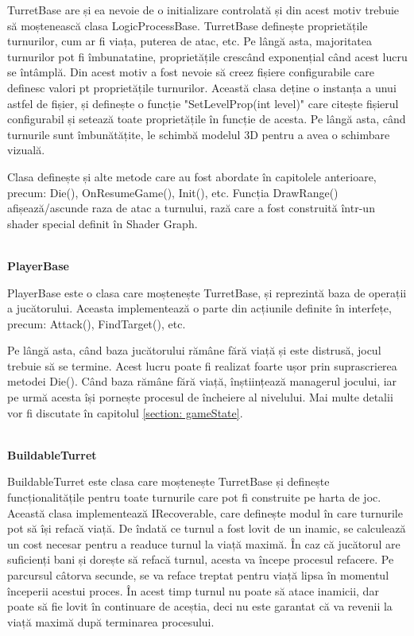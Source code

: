 \documentclass[12pt, a4paper]{article}
\begin{document}
	TurretBase are și ea nevoie de o initializare controlată și din acest motiv trebuie să moștenească clasa LogicProcessBase. TurretBase definește proprietățile turnurilor, cum ar fi viața, puterea de atac, etc. Pe lângă asta, majoritatea turnurilor pot fi îmbunatatine, proprietățile crescând exponențial când acest lucru se întâmplă. Din acest motiv a fost nevoie să creez fișiere configurabile care definesc valori pt proprietățile turnurilor. Această clasa deține o instanța a unui astfel de fișier, și definește o funcție "SetLevelProp(int level)" care citește fișierul configurabil și setează toate proprietățile în funcție de acesta. Pe lângă asta, când turnurile sunt îmbunătățite, le schimbă modelul 3D pentru a avea o schimbare vizuală.
	\newline
	
	Clasa definește și alte metode care au fost abordate în capitolele anterioare, precum: Die(), OnResumeGame(), Init(), etc. Funcția DrawRange() afișează/ascunde raza de atac a turnului, rază care a fost construită într-un shader special definit în Shader Graph.
	
	\ \\
	\textbf{PlayerBase}
	
	PlayerBase este o clasa care moștenește TurretBase, și reprezintă baza de operații a jucătorului. Aceasta implementează o parte din acțiunile definite în interfețe, precum: Attack(), FindTarget(), etc.
	\newline
	
	Pe lângă asta, când baza jucătorului rămâne fără viață și este distrusă, jocul trebuie să se termine. Acest lucru poate fi realizat foarte ușor prin suprascrierea metodei Die(). Când baza rămâne fără viață, înștiințează managerul jocului, iar pe urmă acesta își pornește procesul de încheiere al nivelului. Mai multe detalii vor fi discutate în capitolul \ref{section: gameState}.
	
	\ \\
	\textbf{BuildableTurret}
	
	BuildableTurret este clasa care moștenește TurretBase și definește \newline funcționalitățile pentru toate turnurile care pot fi construite pe harta de joc. Această clasa implementează IRecoverable, care definește modul în care turnurile pot să își refacă viață. De îndată ce turnul a fost lovit de un inamic, se calculează un cost necesar pentru a readuce turnul la viață maximă. În caz că jucătorul are suficienți bani și dorește să refacă turnul, acesta va începe procesul refacere. Pe parcursul câtorva secunde, se va reface treptat pentru viață lipsa în momentul începerii acestui proces. În acest timp turnul nu poate să atace inamicii, dar poate să fie lovit în continuare de aceștia, deci nu este garantat că va revenii la viață maximă după terminarea procesului.
	\newline
	
\end{document}
